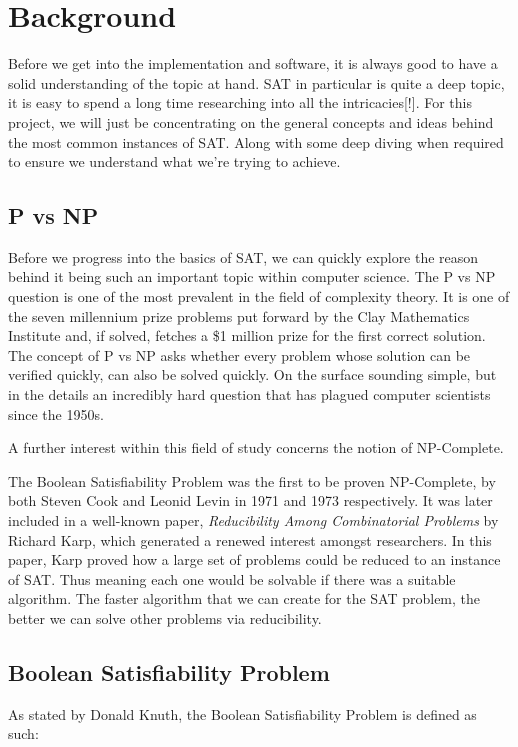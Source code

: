 \documentclass{article}
\begin{document}
\section{Background}
Before we get into the implementation and software, it is always good to have a solid understanding
of the topic at hand. SAT in particular is quite a deep topic, it is easy to spend a long time
researching into all the intricacies[!]. For this project, we will just be concentrating on the
general concepts and ideas behind the most common instances of SAT. Along with some deep diving when required to ensure we
understand what we're trying to achieve.


\subsection{P vs NP}
Before we progress into the basics of SAT, we can quickly explore the reason behind it being such an
important topic within computer science. The P vs NP question is one of the most prevalent in the
field of complexity theory. It is one of the seven millennium prize problems put forward by the Clay
Mathematics Institute and, if solved, fetches a \$1 million prize for the first correct solution.
The concept of P vs NP asks whether every problem whose solution can be verified quickly, can also
be solved quickly. On the surface sounding simple, but in the details an incredibly hard question
that has plagued computer scientists since the 1950s.

A further interest within this field of study concerns the notion of NP-Complete.

The Boolean Satisfiability Problem was the first to be proven NP-Complete, by both Steven Cook and
Leonid Levin in 1971 and 1973 respectively\cite{scook}\cite{levin}. It was later included in a
well-known paper, \textit{Reducibility Among Combinatorial Problems} by Richard Karp\cite{karp},
which generated a renewed interest amongst researchers. In this paper, Karp proved how a large
set of problems could be reduced to an instance of SAT. Thus meaning each one would be solvable if
there was a suitable algorithm. The faster algorithm that we can create for the SAT problem, the
better we can solve other problems via reducibility.

\subsection{Boolean Satisfiability Problem}
As stated by Donald Knuth, the Boolean Satisfiability Problem is defined as such:
\end{document}

